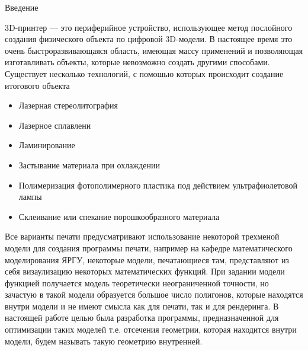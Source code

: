 \clearpage
{}
\begin{flushleft}\Large{Введение}\end{flushleft}
3D-принтер — это периферийное устройство, использующее метод послойного создания физического объекта по цифровой 3D-модели. В настоящее время это очень быстроразвивающаяся область, имеющая массу применений и позволяющая изготавливать объекты, которые невозможно создать другими способами. Существует несколько технологий, с помошью которых происходит создание итогового объекта

\begin{itemize}
\item Лазерная стереолитография
\item Лазерное сплавлени
\item Ламинирование
\item Застывание материала при охлаждении
\item Полимеризация фотополимерного пластика под действием ультрафиолетовой лампы
\item Склеивание или спекание порошкообразного материала
\end{itemize}

Все варианты печати предусматривают использование некоторой трехменой модели для создания программы печати, например на кафедре математического моделирования ЯРГУ, некоторые модели, печатающиеся там, представляют из себя визаулизацию некоторых математических функций. При задании модели функцией получается модель теоретически неограниченной точности, но зачастую в такой модели образуется большое число полигонов, которые находятся внутри модели и не имеют смысла как для печати, так и для рендеринга. В настоящей работе целью была разработка программы, предназначенной для оптимизации таких моделей т.е. отсечения геометрии, которая находится внутри модели, будем называть такую геометрию внутренней.
